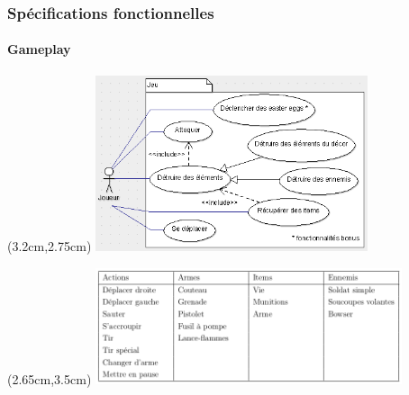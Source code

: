 \begin{frame}
	\frametitle{Spécifications fonctionnelles}
	\framesubtitle{Gameplay}
	{
		\begin{textblock*}{8cm}(3.2cm,2.75cm)
			\includegraphics[width=8cm]{figures/use_case_metal_slug_gameplay.png}
		\end{textblock*}
	}
	{
		\begin{textblock*}{9cm}(2.65cm,3.5cm)
			\includegraphics[width=9cm]{figures/tableau_gameplay.png}
		\end{textblock*}
	}
\end{frame}
